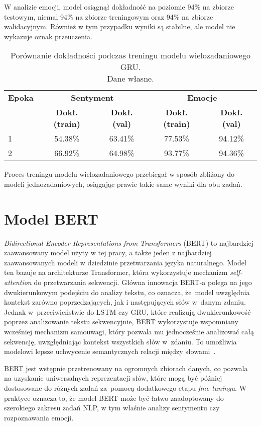 W analizie emocji, model osiągnął dokładność na poziomie 94\% na zbiorze testowym, niemal 94\% na zbiorze treningowym oraz 94\% na zbiorze walidacyjnym. Również w tym przypadku wyniki są stabilne, ale model nie wykazuje oznak przeuczenia.

\begin{table}[H]
\centering
\label{tab:gru_multi_training_process}
\begin{tabular}{|l|c|c|c|c|}
\hline
\textbf{Epoka} & \multicolumn{2}{c|}{\textbf{Sentyment}} & \multicolumn{2}{c|}{\textbf{Emocje}} \\
\cline{2-5}
& \textbf{Dokł. (train)} & \textbf{Dokł. (val)} & \textbf{Dokł. (train)} & \textbf{Dokł. (val)} \\
\hline
1 & 54.38\% & 63.41\% & 77.53\% & 94.12\% \\
2 & 66.92\% & 64.98\% & 93.77\% & 94.36\% \\
\hline
\end{tabular}
\caption{Porównanie dokładności podczas treningu modelu wielozadaniowego GRU.\\Dane własne.}
\end{table}

Proces treningu modelu wielozadaniowego przebiegał w sposób zbliżony do modeli jednozadaniowych, osiągając prawie takie same wyniki dla obu zadań.

\section{Model BERT}
\textit{Bidirectional Encoder Representations from Transformers} (BERT) to najbardziej zaawansowany model użyty w tej pracy, a także jeden z najbardziej zaawansowanych modeli w dziedzinie przetwarzania języka naturalnego. Model ten bazuje na architekturze Transformer, która wykorzystuje mechanizm \textit{self-attention} do przetwarzania sekwencji. Główna innowacja BERT-a polega na jego dwukierunkowym podejściu do analizy tekstu, co oznacza, że~model uwzględnia kontekst zarówno poprzedzających, jak i następujących słów w~danym zdaniu. Jednak w~przeciwieństwie do LSTM czy GRU, które realizują dwukierunkowość poprzez analizowanie tekstu sekwencyjnie, BERT wykorzystuje wspomniany wcześniej mechanizm samouwagi, który pozwala mu jednocześnie analizować całą sekwencję, uwzględniając kontekst wszystkich słów w~zdaniu. To umożliwia modelowi lepsze uchwycenie semantycznych relacji między słowami~\cite{BERT}.

BERT jest wstępnie przetrenowany na ogromnych zbiorach danych, co pozwala na uzyskanie uniwersalnych reprezentacji słów, które mogą być później dostosowane do różnych zadań za~pomocą dodatkowego etapu \textit{fine-tuningu}. W praktyce oznacza to, że model BERT może być łatwo zaadoptowany do szerokiego zakresu zadań NLP, w tym właśnie analizy sentymentu czy rozpoznawania emocji.


